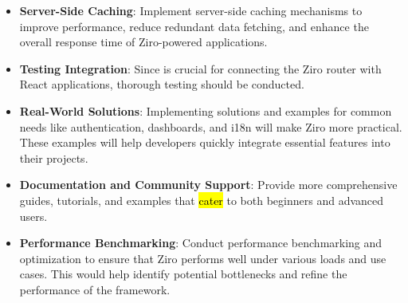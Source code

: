 \begin{itemize}
	\item  \textbf{Server-Side Caching}: Implement server-side caching mechanisms to improve performance, reduce redundant data fetching, and enhance the overall response time of Ziro-powered applications.

	\item \textbf{Testing  Integration}: Since  is crucial for connecting the Ziro router with React applications, thorough testing should be conducted.


	\item  \textbf{Real-World Solutions}: Implementing solutions and examples for common needs like authentication, dashboards, and i18n will make Ziro more practical. These examples will help developers quickly integrate essential features into their projects.

	\item  \textbf{Documentation and Community Support}: Provide more comprehensive guides, tutorials, and examples that \hl{cater} to both beginners and advanced users.

	\item  \textbf{Performance Benchmarking}: Conduct performance benchmarking and optimization to ensure that Ziro performs well under various loads and use cases. This would help identify potential bottlenecks and refine the performance of the framework.

\end{itemize}

\pagebreak
